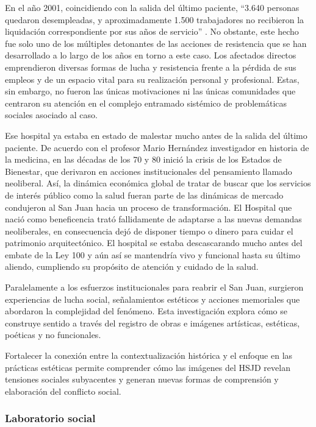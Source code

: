 En el año 2001, coincidiendo con la salida del último paciente, “3.640 personas quedaron desempleadas, y aproximadamente 1.500 trabajadores no recibieron la liquidación correspondiente por sus años de servicio” \parencite{Castiblanco2017}. No obstante, este hecho fue solo uno de los múltiples detonantes de las acciones de resistencia que se han desarrollado a lo largo de los años en torno a este caso. Los afectados directos emprendieron diversas formas de lucha y resistencia frente a la pérdida de sus empleos y de un espacio vital para su realización personal y profesional. Estas, sin embargo, no fueron las únicas motivaciones ni las únicas comunidades que centraron su atención en el complejo entramado sistémico de problemáticas sociales asociado al caso.

Ese hospital ya estaba en estado de malestar mucho antes de la salida del último paciente. De acuerdo con el profesor Mario Hernández investigador en historia de la medicina, en las décadas de los 70 y 80 inició la crisis de los Estados de Bienestar, que derivaron en acciones institucionales del pensamiento llamado neoliberal. Así, la dinámica económica global de tratar de buscar que los servicios de interés público como la salud fueran parte de las dinámicas de mercado condujeron al San Juan hacia un proceso de transformación. El Hospital que nació como beneficencia trató fallidamente de adaptarse a las nuevas demandas neoliberales, en consecuencia dejó de disponer tiempo o dinero para cuidar el patrimonio arquitectónico. El hospital se estaba descascarando mucho antes del embate de la Ley 100 y aún así se mantendría vivo y funcional hasta su último aliendo, cumpliendo su propósito de atención y cuidado de la salud.

Paralelamente a los esfuerzos institucionales para reabrir el San Juan, surgieron experiencias de lucha social, señalamientos estéticos y acciones memoriales que abordaron la complejidad del fenómeno. Esta investigación explora cómo se construye sentido a través del registro de obras e imágenes artísticas, estéticas, poéticas y no funcionales.

Fortalecer la conexión entre la contextualización histórica y el enfoque en las prácticas estéticas permite comprender cómo las imágenes del HSJD revelan tensiones sociales subyacentes y generan nuevas formas de comprensión y elaboración del conflicto social.

\subsubsection*{Laboratorio social}

